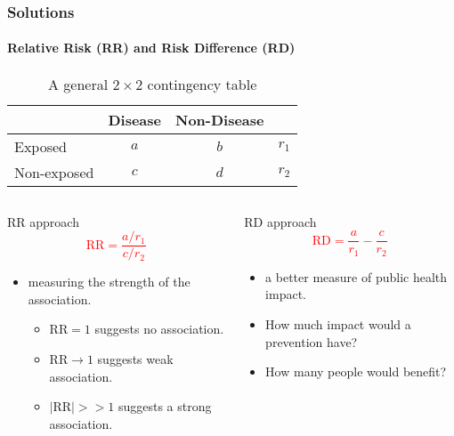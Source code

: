 \documentclass[table,10pt]{beamer}
\begin{document}
\begin{CJK*}{UTF8}{gbsn}
\begin{frame}[t]
\frametitle{Solutions}
\framesubtitle{Relative Risk (RR) and Risk Difference (RD)}
\begin{table}
\renewcommand\arraystretch{1.2}
\scriptsize
\caption{A general $2 \times 2$ contingency table}
\begin{tabular}{lccc}
\hline
 & Disease & Non-Disease & \\
\hline
Exposed & $a$ & $b$ & $r_1$\\
Non-exposed & $c$ & $d$ & $r_2$\\
\hline
\end{tabular}
\end{table}
\begin{columns}
\footnotesize
\begin{column}{0.45\textwidth}
\begin{block}{\center RR approach}
\textcolor{red}{$$
\textrm{RR} = \frac{a/r_1}{c/r_2}
$$}
\begin{itemize}
	\item measuring the strength of the association.
	\begin{itemize}
	\scriptsize
		\item $\textrm{RR}=1$ suggests no association.
		\item $\textrm{RR} \to 1$ suggests weak association.
		\item $|\textrm{RR}|>>1$ suggests a strong association.
	\end{itemize} 
\end{itemize}
\end{block}
\end{column}
\begin{column}{0.45\textwidth}
\begin{block}{\center RD approach}
\textcolor{red}{$$
\textrm{RD} = \frac{a}{r_1} - \frac{c}{r_2}
$$}
\begin{itemize}
	\item a better measure of \alert{public health impact}.
	\item How much impact would a prevention have?
	\item How many people would benefit?
\end{itemize}
\end{block}
\end{column}
\end{columns}
\end{frame}



\end{CJK*}
\end{document}
